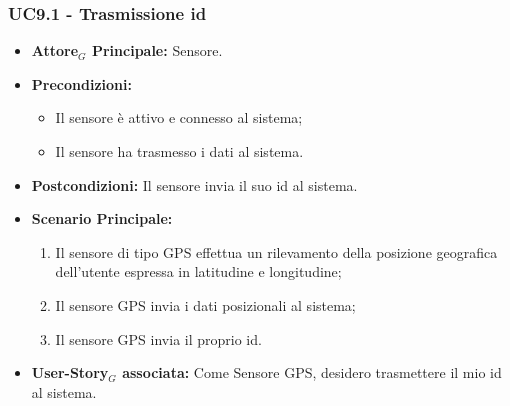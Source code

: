\documentclass[11pt]{article}
\begin{document}
\begin{justify}
\subsubsection{\textbf{UC9.1 - Trasmissione id}}
\begin{itemize}
    \item \textbf{Attore$_G$ Principale:} Sensore.
    \item \textbf{Precondizioni:} 
        \begin{itemize}
    	\item Il sensore è attivo e connesso al sistema;
          \item Il sensore ha trasmesso i dati al sistema.
        \end{itemize}
    \item \textbf{Postcondizioni:} Il sensore invia il suo id al sistema.
    \item \textbf{Scenario Principale:} 
        \begin{enumerate}
            \item Il sensore di tipo GPS effettua un rilevamento della posizione geografica dell'utente espressa in latitudine e longitudine;
            \item Il sensore GPS invia i dati posizionali al sistema;
            \item Il sensore GPS invia il proprio id.
        \end{enumerate}
    \item \textbf{User-Story$_G$ associata:} Come Sensore GPS, desidero trasmettere il mio id al sistema.
\end{itemize}

\end{justify}
\end{document}
